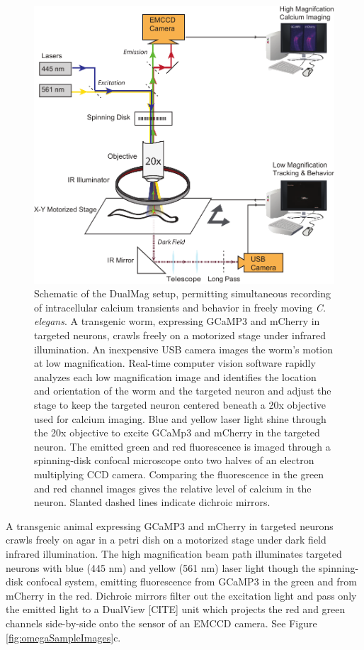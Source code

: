 \begin{figure} %
\includegraphics[width=\textwidth]{figures/omegaCalciumImagingSetup}
\caption[DualMag system apparatus.]{Schematic of the DualMag setup, permitting simultaneous recording of intracellular calcium transients and behavior in freely moving \textit{C. elegans}.  A transgenic worm, expressing GCaMP3 and mCherry in targeted neurons, crawls freely on a motorized stage under infrared illumination. An inexpensive USB camera images the worm's motion at low magnification. Real-time computer vision software rapidly analyzes each low magnification image and identifies the location and orientation of the worm and the targeted neuron and adjust the stage to keep the targeted neuron centered beneath a 20x objective used for calcium imaging.  Blue and yellow laser light shine through the 20x objective to excite GCaMp3 and mCherry in the targeted neuron. The emitted green and red fluorescence  is imaged through a spinning-disk confocal microscope onto two halves of an electron multiplying CCD camera.  Comparing the fluorescence in the green and red  channel images gives the relative level of calcium in the neuron. Slanted dashed lines indicate dichroic mirrors. \label{fig:omegaSchematic}}
\end{figure}


A transgenic animal  expressing GCaMP3 and mCherry in targeted neurons crawls freely on agar in a petri dish on a motorized stage under dark field infrared illumination. The high magnification beam path illuminates targeted neurons with  blue (445 nm) and yellow (561 nm) laser light though the spinning-disk confocal system, emitting fluorescence from GCaMP3 in the green and from mCherry in the red. Dichroic mirrors filter out the excitation light and pass only the emitted light to a DualView [CITE] unit which projects the red and green channels side-by-side onto the sensor of an  EMCCD camera. See Figure \ref{fig:omegaSampleImages}c. 


